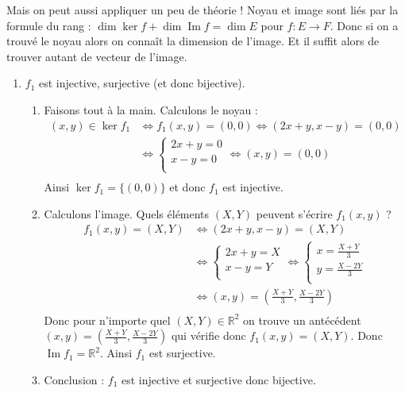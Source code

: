 \documentclass[11pt,a4paper]{article}
\newcommand{\Rr}{\mathbb{R}} \newcommand{\R}{\mathbb{R}}
\renewcommand{\Im}{\mathop{\mathrm{Im}}\nolimits}
\begin{document}
Mais on peut aussi appliquer un peu de théorie ! Noyau et image sont liés par la formule du rang : 
$\dim \ker f + \dim \Im f = \dim E$
pour $f : E \to F$. Donc si on a trouvé le noyau alors on connaît la dimension de l'image.
Et il suffit alors de trouver autant de vecteur de l'image.


\begin{enumerate}
  \item $f_1$ est injective, surjective (et donc bijective).

  \begin{enumerate}
  \item Faisons tout à la main. Calculons le noyau :
\begin{align*}
(x,y) \in \ker f_1
  & \iff f_1(x,y) = (0,0) 
  \iff (2x+y,x-y) = (0,0) \\
  &\iff \begin{cases}
         2x+y=0 \\
        x-y=0 \\   
        \end{cases}
  \iff (x,y)=(0,0) \\
\end{align*}
Ainsi $\ker f_1 = \{ (0,0) \}$ et donc $f_1$ est injective.

   \item Calculons l'image. Quels éléments $(X,Y)$ peuvent s'écrire $f_1(x,y)$ ?
\begin{align*}
f_1(x,y) = (X,Y) 
  & \iff (2x+y,x-y) = (X,Y) \\
  &\iff \begin{cases}
         2x+y=X \\
         x-y=Y \\   
        \end{cases} 
  \iff \begin{cases}
         x=\frac{X+Y}{3} \\
         y=\frac{X-2Y}{3} \\   
        \end{cases} \\
  & \iff (x,y)=\left(\frac{X+Y}{3},\frac{X-2Y}{3}\right) \\
\end{align*}
Donc pour n'importe quel $(X,Y)\in\Rr^2$ on trouve un antécédent $(x,y)=(\frac{X+Y}{3},\frac{X-2Y}{3})$
qui vérifie donc $f_1(x,y)=(X,Y)$. Donc $\Im f_1 = \Rr^2$. Ainsi $f_1$ est surjective.

  \item Conclusion : $f_1$ est injective et surjective donc bijective.
  \end{enumerate}



\end{enumerate}
\end{document}
